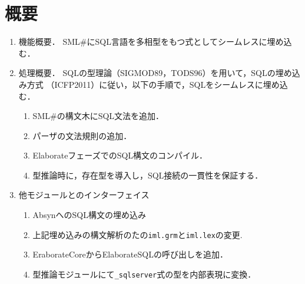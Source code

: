 \documentclass{jbook}
\newcommand{\smlsharp}{SML\#}
\newcommand{\code}[1]{\mbox{\large\tt #1}}
\begin{document}
\section{概要}
\begin{enumerate}
\item 機能概要．
	\smlsharp{}にSQL言語を多相型をもつ式としてシームレスに埋め込む．
\item 処理概要．
	SQLの型理論（SIGMOD89，TODS96）を用いて，SQLの埋め込み方式
（ICFP2011）に従い，以下の手順で，SQLをシームレスに埋め込む．
\begin{enumerate}
\item \smlsharp{}の構文木にSQL文法を追加．
\item パーザの文法規則の追加．
\item ElaborateフェーズでのSQL構文のコンパイル．
\item 型推論時に，存在型を導入し，SQL接続の一貫性を保証する．
\end{enumerate}
\item 他モジュールとのインターフェイス
\begin{enumerate}
\item AbsynへのSQL構文の埋め込み
\item 上記埋め込みの構文解析のたの\code{iml.grm}と\code{iml.lex}の変更.
\item EraborateCoreからElaborateSQLの呼び出しを追加．
\item 型推論モジュールにて\code{\_sqlserver}式の型を内部表現に変換．
\end{enumerate}
\end{enumerate}
\end{document}
